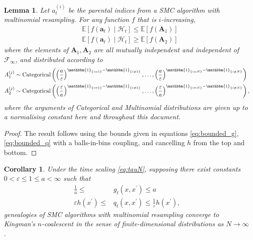 \documentclass[fleqn]{article}
\newtheorem{lemma}{Lemma}
\newtheorem{corollary}{Corollary}
\theoremstyle{definition}
\newcommand{\E}{\mathbb{E}}
\newcommand{\1}[1]{\mathbbm{1}_{\{#1\}}}
\newcommand{\Cat}{\operatorname{Categorical}}
\begin{document}
\begin{lemma}\label{lem:i_increasing}
Let $a_t^{(i)}$ be the parental indices from a SMC algorithm with multinomial resampling. For any function $f$ that is $i$-increasing, 
\begin{align*}
& \E[f(\mathbf{a}_t) \mid \mathcal{H}_t] \leq \E[f(\mathbf{A}_1)] \\
& \E[f(\mathbf{a}_t) \mid \mathcal{H}_t] \geq \E[f(\mathbf{A}_2)]
\end{align*}
where the elements of $\mathbf{A}_1, \mathbf{A}_2$ are all mutually independent and independent of $\mathcal{F}_{\infty}$, and distributed according to
\begin{align*}
& A_1^{(j)} \sim \Cat\left( \left( \frac{a}{\varepsilon} \right)^{\1{i=1} -\1{i\neq 1}} ,\dots, \left( \frac{a}{\varepsilon} \right)^{\1{i=N} -\1{i\neq N}} \right) \\
& A_2^{(j)} \sim \Cat\left( \left( \frac{\varepsilon}{a} \right)^{\1{i=1} -\1{i\neq 1}} ,\dots, \left( \frac{\varepsilon}{a} \right)^{\1{i=N} -\1{i\neq N}} \right),
\end{align*}
where the arguments of Categorical and Multinomial distributions are given up to a normalising constant here and throughout this document.
\end{lemma}
\begin{proof}
The result follows using the bounds given in equations \eqref{eq:bounded_g}, \eqref{eq:bounded_q} with a balls-in-bins coupling, and cancelling $h$ from the top and bottom.
\end{proof}

\begin{corollary}\label{thm:mn_newassns}
Under the time scaling \eqref{eq:tauN}, supposing there exist constants $0<\varepsilon\leq 1\leq a<\infty$ such that
\begin{align}
\frac{1}{a} \leq &g_t(x, x^\prime) \leq a \label{eq:bounded_g}\\
\varepsilon h(x^\prime) \leq &q_t(x, x^\prime) \leq \frac{1}{\varepsilon} h(x^\prime) ,\label{eq:bounded_q}
\end{align}
genealogies of SMC algorithms with multinomial resampling converge to Kingman's $n$-coalescent in the sense of finite-dimensional distributions as $N\to\infty$.
\end{corollary}
\end{document}
